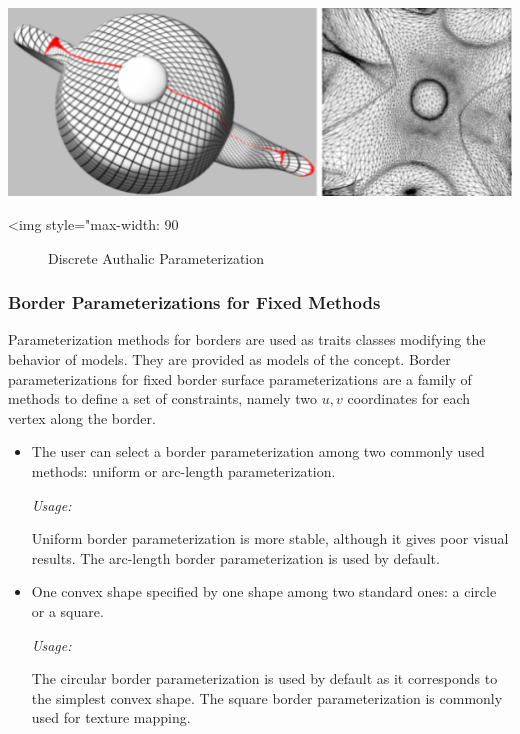 \begin{center}
    \label{Surface_mesh_parameterization-fig-authalic}
    \begin{ccTexOnly}
        \includegraphics[width=1.0\textwidth]{Surface_mesh_parameterization/authalic}
    \end{ccTexOnly}
    \begin{ccHtmlOnly}
        <img style="max-width: 90%
    \end{ccHtmlOnly}
    \begin{figure}[ht]
        \caption{Discrete Authalic Parameterization}
    \end{figure}
\end{center}

\subsubsection{Border Parameterizations for Fixed Methods
\label{sec:Border-Parameterizations-for-Fixed-Methods}}

Parameterization methods for
borders are used as traits classes modifying the behavior of
 models.
They are provided as models of the  concept.
Border parameterizations for fixed border surface parameterizations
are a family of methods to define a set of constraints, namely two
$u,v$ coordinates for each vertex along the border.

\begin{itemize}

\item
    The user can select a border parameterization among
    two commonly used methods: uniform or arc-length parameterization.

    \emph{Usage:}

    Uniform border parameterization is more stable, although it gives
    poor visual results. The
    arc-length border parameterization is used by default.

\item
    One convex shape specified by one shape among two standard ones:
    a circle or a square.

    \emph{Usage:}

    The circular border parameterization is used by default as it
    corresponds to the simplest convex shape. The square border
    parameterization is commonly used for texture mapping.

\end{itemize}

